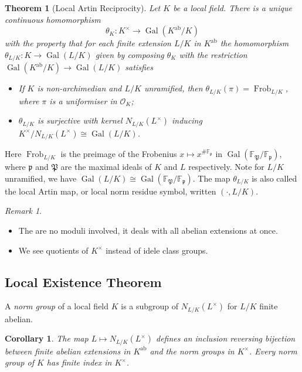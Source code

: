 \documentclass[11pt]{article}
\theoremstyle{definition}
\theoremstyle{plain}
\newtheorem{theorem}[definition]{Theorem}
\newtheorem{corollary}[definition]{Corollary}
\theoremstyle{remark}
\newtheorem*{remark*}{Remark}
\DeclareMathOperator{\Gal}{Gal}
\DeclareMathOperator{\Frob}{Frob}
\newcommand{\FF}{\mathbb{F}}
\newcommand{\cO}{\mathcal{O}}
\newcommand{\cp}{\mathfrak{P}}
\newcommand{\fp}{\mathfrak{p}}
\newcommand{\ab}{\mathrm{ab}}
\begin{document}
\begin{theorem}[Local Artin Reciprocity]\label{thm:11_1}
    Let $K$ be a local field. There is a unique continuous homomorphism
    \begin{equation*}
        \theta_K : K^\times \to \Gal(K^\ab / K)
    \end{equation*}
    with the property that for each finite extension $L/K$ in $K^\ab$ the homomorphism $\theta_{L/K} : K \to \Gal(L/K)$ given by composing $\theta_K$ with the restriction $\Gal(K^\ab / K) \to \Gal(L/K)$ satisfies
    \begin{itemize}
        \item If $K$ is non-archimedian and $L/K$ unramified, then $\theta_{L/K}(\pi) = \Frob_{L/K}$, where $\pi$ is a uniformiser in $\cO_K$;
        \item $\theta_{L/K}$ is surjective with kernel $N_{L/K}(L^\times)$ inducing $K^\times / N_{L/K}(L^\times) \cong \Gal(L/K)$.
    \end{itemize}
\end{theorem}

Here $\Frob_{L/K}$ is the preimage of the Frobenius $x \mapsto x^{\# \FF_\fp}$ in $\Gal(\FF_\cp / \FF_\fp)$, where $\fp$ and $\cp$ are the maximal ideals of $K$ and $L$ respectively. Note for $L/K$ unramified, we have $\Gal(L/K) \cong \Gal(\FF_\cp / \FF_\fp)$. The map $\theta_{L/K}$ is also called the local Artin map, or local norm residue symbol, written $(\cdot, L/K)$.

\begin{remark*}\phantom{}
    \begin{itemize}
        \item The are no moduli involved, it deals with all abelian extensions at once.
        \item We see quotients of $K^\times$ instead of idele class groups.
    \end{itemize}
\end{remark*}

\subsection{Local Existence Theorem}

A \emph{norm group} of a local field $K$ is a subgroup of $N_{L/K}(L^\times)$ for $L/K$ finite abelian.

\begin{corollary}\label{cor:11_2}
    The map $L \mapsto N_{L/K}(L^\times)$ defines an inclusion reversing bijection between finite abelian extensions in $K^\ab$ and the norm groups in $K^\times$. Every norm group of $K$ has finite index in $K^\times$.
\end{corollary}
\end{document}
